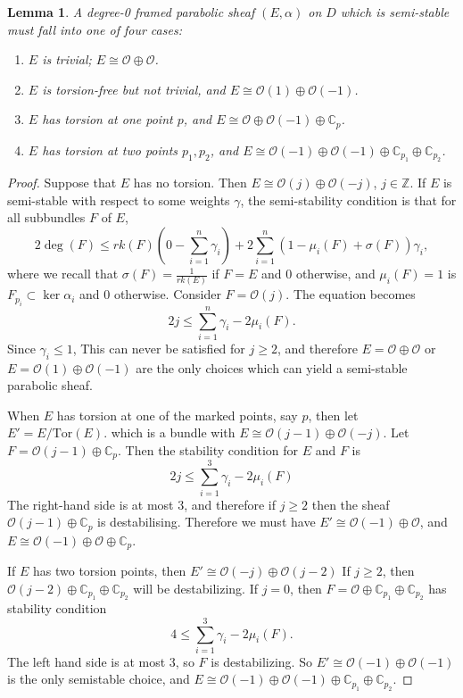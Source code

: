 \documentclass[]{article}
\newtheorem{lemma}{Lemma}
\newcommand{\C}{\mathbb{C}}
\newcommand{\OO}{\mathcal{O}}
\begin{document}
	\begin{lemma}
		A degree-0 framed parabolic sheaf $(E,\alpha)$ on $D$ which is semi-stable must fall into one of four cases:
		\begin{enumerate}
			\item $E$ is trivial; $E\cong \OO\oplus \OO$.
			\item $E$ is torsion-free but not trivial, and $E\cong \OO(1)\oplus\OO(-1)$.
			\item $E$ has torsion at one point $p$, and $E\cong \OO\oplus\OO(-1)\oplus \C_p$.
			\item $E$ has torsion at two points $p_1,p_2$, and $E\cong \OO(-1)\oplus\OO(-1)\oplus\C_{p_1}\oplus \C_{p_2}$.
		\end{enumerate}
	\end{lemma}
	\begin{proof}
		Suppose that $E$ has no torsion. Then $E \cong \OO(j)\oplus \OO(-j)$, $j\in\mathbb{Z}$. If $E$ is semi-stable with respect to some weights $\gamma$, the semi-stability condition is that for all subbundles $F$ of $E$,
		\begin{equation}
			2\deg(F) \leq rk(F)\left(
			0-\sum_{i=1}^n \gamma_i
			\right) + 2\sum_{i=1}^n(1-\mu_i(F) + \sigma(F))\gamma_i,
		\end{equation}
		where we recall that $\sigma(F) = \frac{1}{rk(E)}$ if $F=E$ and $0$ otherwise, and $\mu_i(F) = 1$ is $F_{p_i} \subset \ker \alpha_i$ and $0$ otherwise. Consider $F = \OO(j)$. The equation becomes
		\begin{equation}
			2j \leq \sum_{i=1}^n \gamma_i - 2\mu_i(F).
		\end{equation}
		Since $\gamma_i \leq 1$, This can never be satisfied for $j \geq 2$, and therefore $E = \OO\oplus\OO$ or $E=\OO(1)\oplus\OO(-1)$ are the only choices which can yield a semi-stable parabolic sheaf. 
		
		When $E$ has torsion at one of the marked points, say $p$, then let $E' = E/\text{Tor}(E)$.
		which is a bundle with $E\cong \OO(j-1)\oplus\OO(-j)$. Let $F=\OO(j-1)\oplus \C_p$. Then the stability condition for $E$ and $F$ is
		\begin{equation}
			2j \leq \sum_{i=1}^3 \gamma_i -2\mu_i(F)
		\end{equation}
		The right-hand side is at most 3, and therefore if $j\geq 2$ then the sheaf $\OO(j-1)\oplus \C_p$ is destabilising. Therefore we must have $E' \cong \OO(-1)\oplus \OO$, and $E \cong \OO(-1)\oplus \OO \oplus \C_p$. 
		
		If $E$ has two torsion points, then $E'\cong \OO(-j)\oplus\OO(j-2)$ If $j\geq 2$, then $\OO(j-2)\oplus \C_{p_1}\oplus \C_{p_2}$ will be destabilizing. If $j=0$, then $F=\OO\oplus\C_{p_1}\oplus \C_{p_2}$ has stability condition
		\begin{equation}
			4 \leq \sum_{i=1}^3 \gamma_i - 2\mu_i(F).
		\end{equation}
		The left hand side is at most 3, so $F$ is destabilizing. So $E' \cong \OO(-1)\oplus \OO(-1)$ is the only semistable choice, and $E \cong \OO(-1)\oplus \OO(-1)\oplus \C_{p_1} \oplus \C_{p_2}$. 
		

\end{proof}
\end{document}
